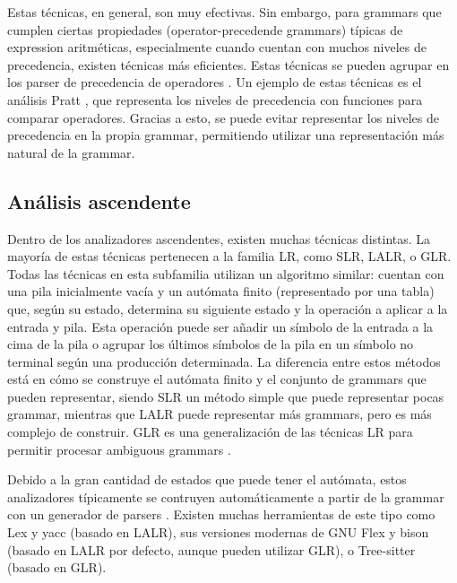 Estas técnicas, en general, son muy efectivas. Sin embargo, para \glspl{grammar}
que cumplen ciertas propiedades (\glspl{operator-precedende grammar}) típicas de
\gls{expression} aritméticas, especialmente cuando cuentan con muchos niveles de
precedencia, existen técnicas más eficientes. Estas técnicas se pueden agrupar
en los \gls{parser} de precedencia de operadores
\parencite{operator-precedence-parser}. Un ejemplo de estas técnicas es el
análisis Pratt \parencite{pratt-parsing-paper}
\parencite{pratt-parsing-example}, que representa los niveles de precedencia con
funciones para comparar operadores. Gracias a esto, se puede evitar representar los niveles de
precedencia en la propia \gls{grammar}, permitiendo utilizar una representación
más natural de la \gls{grammar}.

\subsection{Análisis ascendente}

Dentro de los analizadores ascendentes, existen muchas técnicas distintas. La
mayoría de estas técnicas pertenecen a la familia LR, como SLR, LALR, o GLR.
Todas las técnicas en esta subfamilia utilizan un algoritmo similar: cuentan con
una pila inicialmente vacía y un autómata finito (representado por una tabla)
que, según su estado, determina su siguiente estado y la operación a aplicar a
la entrada y pila. Esta operación puede ser añadir un símbolo de la entrada a la
cima de la pila o agrupar los últimos símbolos de la pila en un símbolo no
terminal según una producción determinada. La diferencia entre estos métodos
está en cómo se construye el autómata finito y el conjunto de \glspl{grammar}
que pueden representar, siendo SLR un método simple que puede representar pocas
\gls{grammar}, mientras que LALR puede representar más \glspl{grammar}, pero es
más complejo de construir. \parencite{dragon-book} GLR es una generalización de
las técnicas LR para permitir procesar \glspl{ambiguous grammar}
\parencite{GLR-algorithm}.

Debido a la gran cantidad de estados que puede tener el autómata, estos
analizadores típicamente se contruyen automáticamente a partir de la
\gls{grammar} con un generador de \glspl{parser} \parencite{dragon-book}.
Existen muchas herramientas de este tipo como Lex y yacc \parencite{yacc}
(basado en LALR), sus versiones modernas de GNU Flex y bison \parencite{bison}
(basado en LALR por defecto, aunque pueden utilizar GLR), o Tree-sitter
\parencite{tree-sitter} (basado en GLR).
